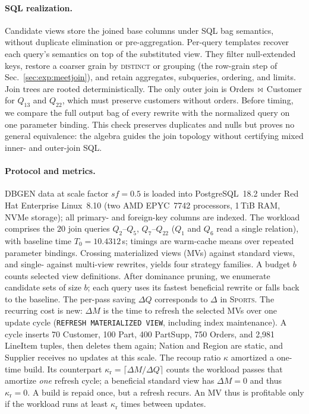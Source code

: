 \documentclass[sigconf]{acmart}
\begin{document}
\paragraph{SQL realization.}
Candidate views store the joined base columns under SQL bag semantics, without duplicate elimination or pre-aggregation. Per-query templates recover each query's semantics on top of the substituted view. They filter null-extended keys, restore a coarser grain by \textsc{distinct} or grouping (the row-grain step of Sec.~\ref{sec:exp:meetjoin}), and retain aggregates, subqueries, ordering, and limits. Join trees are rooted deterministically. The only outer join is \textsf{Orders}\,$\bowtie$\,\textsf{Customer} for $Q_{13}$ and $Q_{22}$, which must preserve customers without orders. Before timing, we compare the full output bag of every rewrite with the normalized query on one parameter binding. This check preserves duplicates and nulls but proves no general equivalence: the algebra guides the join topology without certifying mixed inner- and outer-join SQL.

\paragraph{Protocol and metrics.}
DBGEN data at scale factor $\textit{sf}=0.5$ is loaded into PostgreSQL~18.2 under Red Hat Enterprise Linux~8.10 (two AMD EPYC~7742 processors, 1\,TiB RAM, NVMe storage); all primary- and foreign-key columns are indexed. The workload comprises the $20$ join queries $Q_2$--$Q_5$, $Q_7$--$Q_{22}$ ($Q_1$ and $Q_6$ read a single relation), with baseline time $T_0=10.4312$\,s; timings are warm-cache means over repeated parameter bindings. Crossing materialized views (MVs) against standard views, and single- against multi-view rewrites, yields four strategy families. A budget $b$ counts selected view definitions. After dominance pruning, we enumerate candidate sets of size $b$; each query uses its fastest beneficial rewrite or falls back to the baseline. The per-pass saving $\Delta Q$ corresponds to $\Delta$ in \textsc{Sports}. The recurring cost is new: $\Delta M$ is the time to refresh the selected MVs over one update cycle (\texttt{REFRESH MATERIALIZED VIEW}, including index maintenance). A cycle inserts 70 \textsf{Customer}, 100 \textsf{Part}, 400 \textsf{PartSupp}, 750 \textsf{Orders}, and 2,981 \textsf{LineItem} tuples, then deletes them again; \textsf{Nation} and \textsf{Region} are static, and \textsf{Supplier} receives no updates at this scale. The recoup ratio $\kappa$ amortized a one-time build. Its counterpart $\kappa_{\mathrm r}=\lceil\Delta M/\Delta Q\rceil$ counts the workload passes that amortize \emph{one} refresh cycle; a beneficial standard view has $\Delta M=0$ and thus $\kappa_{\mathrm r}=0$. A build is repaid once, but a refresh recurs. An MV thus is profitable only if the workload runs at least $\kappa_{\mathrm r}$ times between updates.
\end{document}
